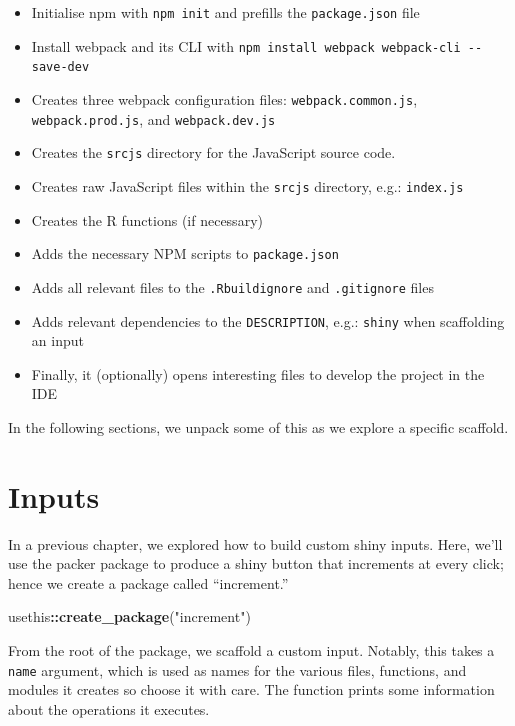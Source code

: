 \documentclass[
  10pt,
]{krantz}
\makeatletter
\newenvironment{Shaded}{\begin{snugshade}}{\end{snugshade}}
\newcommand{\KeywordTok}[1]{\textcolor[rgb]{0.27,0.27,0.27}{\textbf{#1}}}
\newcommand{\NormalTok}[1]{#1}
\newcommand{\OperatorTok}[1]{\textcolor[rgb]{0.43,0.43,0.43}{\textbf{#1}}}
\newcommand{\StringTok}[1]{\textcolor[rgb]{0.5,0.5,0.5}{#1}}
\providecommand{\tightlist}{%
  \setlength{\itemsep}{0pt}\setlength{\parskip}{0pt}}
\newenvironment{kframe}{%
\medskip{}
\setlength{\fboxsep}{.8em}
 \def\at@end@of@kframe{}%
 \ifinner\ifhmode%
  \def\at@end@of@kframe{\end{minipage}}%
  \begin{minipage}{\columnwidth}%
 \fi\fi%
 \def\FrameCommand##1{\hskip\@totalleftmargin \hskip-\fboxsep
 \colorbox{shadecolor}{##1}\hskip-\fboxsep
     \hskip-\linewidth \hskip-\@totalleftmargin \hskip\columnwidth}%
 \MakeFramed {\advance\hsize-\width
   \@totalleftmargin\z@ \linewidth\hsize
   \@setminipage}}%
 {\par\unskip\endMakeFramed%
 \at@end@of@kframe}
\renewenvironment{Shaded}{\begin{kframe}}{\end{kframe}}
\makeatother
\begin{document}
\begin{itemize}
\tightlist
\item
  Initialise npm with \texttt{npm\ init} and prefills the \texttt{package.json} file
\item
  Install webpack and its CLI with \texttt{npm\ install\ webpack\ webpack-cli\ -\/-save-dev}
\item
  Creates three webpack configuration files: \texttt{webpack.common.js}, \texttt{webpack.prod.js}, and \texttt{webpack.dev.js}
\item
  Creates the \texttt{srcjs} directory for the JavaScript source code.
\item
  Creates raw JavaScript files within the \texttt{srcjs} directory, e.g.: \texttt{index.js}
\item
  Creates the R functions (if necessary)
\item
  Adds the necessary NPM scripts to \texttt{package.json}
\item
  Adds all relevant files to the \texttt{.Rbuildignore} and \texttt{.gitignore} files
\item
  Adds relevant dependencies to the \texttt{DESCRIPTION}, e.g.: \texttt{shiny} when scaffolding an input
\item
  Finally, it (optionally) opens interesting files to develop the project in the IDE
\end{itemize}

In the following sections, we unpack some of this as we explore a specific scaffold.

\hypertarget{packer-inputs}{%
\section{Inputs}\label{packer-inputs}}

In a previous chapter, we explored how to build custom shiny inputs. Here, we'll use the packer package to produce a shiny button that increments at every click; hence we create a package called ``increment.''

\begin{Shaded}
\begin{Highlighting}[]
\NormalTok{usethis}\OperatorTok{::}\KeywordTok{create\_package}\NormalTok{(}\StringTok{"increment"}\NormalTok{)}
\end{Highlighting}
\end{Shaded}

From the root of the package, we scaffold a custom input. Notably, this takes a \texttt{name} argument, which is used as names for the various files, functions, and modules it creates so choose it with care. The function prints some information about the operations it executes.
\end{document}
